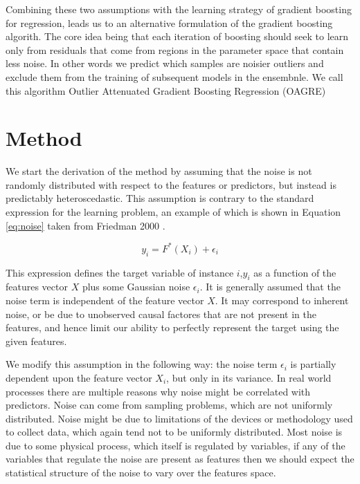 \documentclass[graybox]{svmult}
\begin{document}
Combining these two assumptions with the learning strategy of gradient boosting for regression, leads us to an
alternative formulation of the gradient boosting algorith. The core idea being that each iteration of boosting should
seek to learn only from residuals that come from regions in the parameter space that contain less noise. In other
words we predict which samples are noisier outliers and exclude them from the training of subsequent models in the
ensembnle. We call this algorithm Outlier Attenuated Gradient Boosting Regression (OAGRE)

\section{Method}

We start the derivation of the method by assuming that the noise is not randomly distributed with respect to the
features or predictors, but instead is predictably heteroscedastic.
This assumption is contrary to the standard expression for the learning problem,
an example of which is shown in Equation \ref{eq:noise} taken from Friedman 2000 \cite{Friedman2000}.

\begin{equation}
y_i = F^*(X_i) + \epsilon_i
\label{eq:noise}
\end{equation}

This expression defines the target variable of instance $i$,$y_i$ as a function of the features vector $X$
plus some Gaussian noise $\epsilon_i$. It is generally assumed that the noise term is independent of the 
feature vector $X$. It may correspond to inherent noise, or be due to unobserved causal factores that are
not present in the features, and hence limit our ability to perfectly represent the target using the given
features.
 
We modify this assumption in the following way: the noise term $\epsilon_i$ is partially dependent upon the
feature vector $X_i$, but only in its variance. In real world processes there are multiple reasons
why noise might be correlated with predictors. Noise can come from sampling problems,
which are not uniformly distributed. Noise might be due to limitations of the devices
or methodology used to collect data, which again tend not to be uniformly distributed.
Most noise is due to some physical process, which itself is regulated by variables,
if any of the variables that regulate the noise are present as features then we should 
expect the statistical structure of the noise to vary over the features space.
\end{document}
